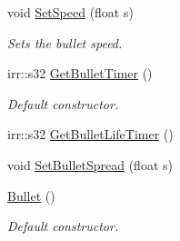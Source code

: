 \begin{DoxyCompactItemize}
void \hyperlink{class_bullet_a7a2e293d6bc42d3b018815a0302a0074}{Set\-Speed} (float s)
\begin{DoxyCompactList}\small\item\em Sets the bullet speed. \end{DoxyCompactList}\item 
irr\-::s32 \hyperlink{class_bullet_a5cc762f8b276d0ad812ed3b1fc411626}{Get\-Bullet\-Timer} ()
\begin{DoxyCompactList}\small\item\em Default constructor. \end{DoxyCompactList}\item 
irr\-::s32 \hyperlink{class_bullet_a62aadef0cc64e5ae9085cc4e0267e920}{Get\-Bullet\-Life\-Timer} ()
\item 
void \hyperlink{class_bullet_a1fd596da19949b3dfdba7febd1b162f1}{Set\-Bullet\-Spread} (float s)
\item 
\hyperlink{class_bullet_acd7befc0bc18907cc1d871d37bbdddeb}{Bullet} ()
\begin{DoxyCompactList}\small\item\em Default constructor. \end{DoxyCompactList}\end{DoxyCompactItemize}

